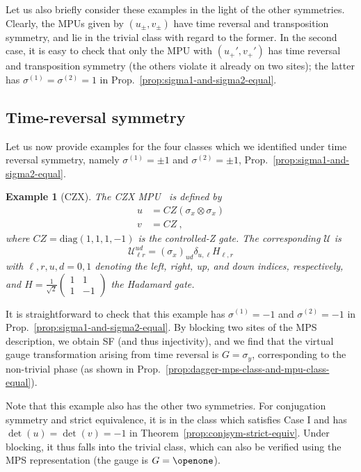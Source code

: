\documentclass[pra,twocolumn,nofootinbib,superscriptaddress]{revtex4-1}
\newtheorem{example}[thm]{Example}
\begin{document}
Let us also briefly consider these examples in the light of the other
symmetries.  Clearly, the MPUs given by $(u_\pm,v_\pm)$ have time reversal
and transposition symmetry, and lie in the trivial class with regard to the
former.  In the second case, it is easy to check that only the MPU with
$(u_+',v_+')$ has time reversal and transposition symmetry (the others
violate it already on two sites); the latter has
$\sigma^{(1)}=\sigma^{(2)}=1$ in
Prop.~\ref{prop:sigma1-and-sigma2-equal}.


\subsection{Time-reversal symmetry}

Let us now provide examples for the four classes which we identified under
time reversal symmetry, namely $\sigma^{(1)}=\pm1$ and
$\sigma^{(2)}=\pm1$, Prop.~\ref{prop:sigma1-and-sigma2-equal}.



\begin{example}[CZX]
	\label{example:czx}
	The CZX MPU~\cite{chen:2d-spt-phases-peps-ghz} is defined by
	\begin{align*}
		u & = CZ(\sigma_x\otimes \sigma_x) \\
		v & = CZ\ ,
	\end{align*}
	where $CZ=\mathrm{diag}(1,1,1,-1)$ is the controlled-Z gate. The
	corresponding $\mathcal U$ is
	\[
		\mathcal U_{\ell r}^{ud} = (\sigma_x)_{ud}\delta_{u,\ell}H_{\ell,r}
	\]
	with $\ell,r,u,d=0,1$ denoting the left, right, up, and down indices,
	respectively, and $H=\tfrac{1}{\sqrt{2}}
		\left(\begin{smallmatrix}1&1\\1&-1\end{smallmatrix}\right)$ the Hadamard
	gate.
\end{example}
\noindent
It is straightforward to check that this example has $\sigma^{(1)}=-1$ and
$\sigma^{(2)}=-1$ in Prop.~\ref{prop:sigma1-and-sigma2-equal}. By blocking
two sites of the MPS description, we obtain SF (and thus injectivity), and
we find that the virtual gauge transformation arising from time reversal
is $G=\sigma_y$, corresponding to the non-trivial phase (as shown in
Prop.~\ref{prop:dagger-mps-class-and-mpu-class-equal}).

Note that this example also has the other two symmetries. For conjugation
symmetry and strict equivalence, it is in the class which satisfies Case I
and has $\det(u)=\det(v)=-1$ in Theorem~\ref{prop:conjsym-strict-equiv}.
Under blocking, it thus falls into the trivial class, which can also be
verified using the MPS representation (the gauge is $G=\openone$).
\end{document}
